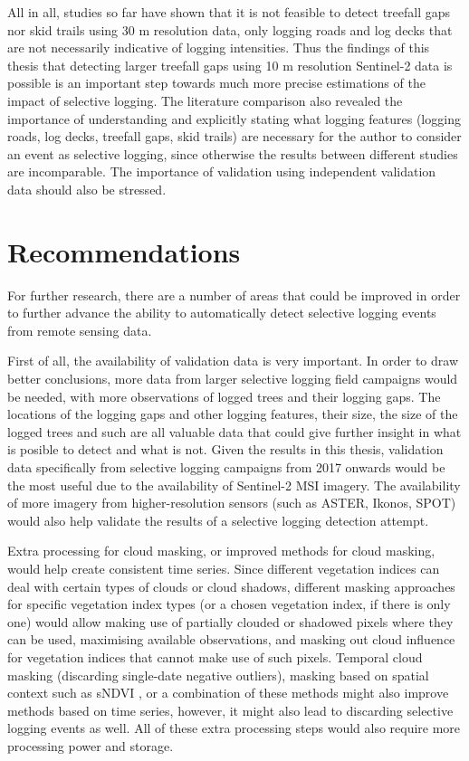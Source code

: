 \documentclass[a4paper,12pt]{scrbook}
\begin{document}
All in all, studies so far have shown that it is not feasible to detect treefall gaps nor skid trails using 30 m resolution data, only logging roads and log decks that are not necessarily indicative of logging intensities. Thus the findings of this thesis that detecting larger treefall gaps using 10 m resolution Sentinel-2 data is possible is an important step towards much more precise estimations of the impact of selective logging. The literature comparison also revealed the importance of understanding and explicitly stating what logging features (logging roads, log decks, treefall gaps, skid trails) are necessary for the author to consider an event as selective logging, since otherwise the results between different studies are incomparable. The importance of validation using independent validation data should also be stressed.

\section{Recommendations}

For further research, there are a number of areas that could be improved in order to further advance the ability to automatically detect selective logging events from remote sensing data.

First of all, the availability of validation data is very important. In order to draw better conclusions, more data from larger selective logging field campaigns would be needed, with more observations of logged trees and their logging gaps. The locations of the logging gaps and other logging features, their size, the size of the logged trees and such are all valuable data that could give further insight in what is posible to detect and what is not. Given the results in this thesis, validation data specifically from selective logging campaigns from 2017 onwards would be the most useful due to the availability of Sentinel-2 \ac{MSI} imagery. The availability of more imagery from higher-resolution sensors (such as ASTER, Ikonos, SPOT) would also help validate the results of a selective logging detection attempt.

Extra processing for cloud masking, or improved methods for cloud masking, would help create consistent time series. Since different vegetation indices can deal with certain types of clouds or cloud shadows, different masking approaches for specific vegetation index types (or a chosen vegetation index, if there is only one) would allow making use of partially clouded or shadowed pixels where they can be used, maximising available observations, and masking out cloud influence for vegetation indices that cannot make use of such pixels. Temporal cloud masking (discarding single-date negative outliers), masking based on spatial context such as sNDVI \citep{hamunyela_using_2016}, or a combination of these methods might also improve methods based on time series, however, it might also lead to discarding selective logging events as well. All of these extra processing steps would also require more processing power and storage.
\end{document}
